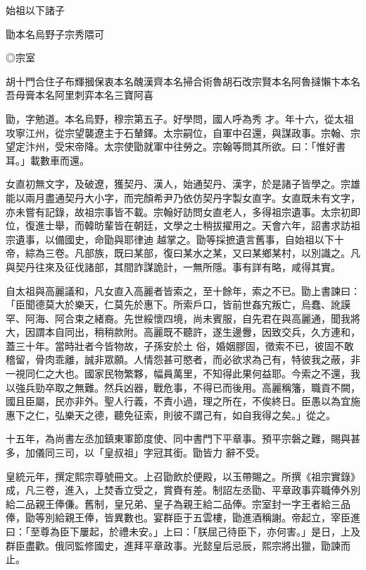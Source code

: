 
\begin{pinyinscope}

 始祖以下諸子



 勖本名烏野子宗秀隈可



 ◎宗室



 胡十門合住子布輝摑保衷本名醜漢齊本名掃合術魯胡石改宗賢本名阿魯撻懶卞本名吾母膏本名阿里刺弈本名三寶阿喜



 勖，字勉道。本名烏野，穆宗第五子。好學問，國人呼為秀
 才。年十六，從太祖攻寧江州，從宗望襲遼主于石輦鐸。太宗嗣位，自軍中召還，與謀政事。宗翰、宗望定汴州，受宋帝降。太宗使勖就軍中往勞之。宗翰等問其所欲。曰：「惟好書耳。」載數車而還。



 女直初無文字，及破遼，獲契丹、漢人，始通契丹、漢字，於是諸子皆學之。宗雄能以兩月盡通契丹大小字，而完顏希尹乃依仿契丹字製女直字。女直既未有文字，亦未嘗有記錄，故祖宗事皆不載。宗翰好訪問女直老人，多得祖宗遺事。太宗初即位，復進士舉，而韓昉輩皆在朝廷，文學之士稍拔擢用之。天會六年，詔書求訪祖宗遺事，以備國史，命勖與耶律迪
 越掌之。勖等採摭遺言舊事，自始祖以下十帝，綜為三卷。凡部族，既曰某部，復曰某水之某，又曰某鄉某村，以別識之。凡與契丹往來及征伐諸部，其間詐謀詭計，一無所隱。事有詳有略，咸得其實。



 自太祖與高麗議和，凡女直入高麗者皆索之，至十餘年，索之不已。勖上書諫曰：「臣聞德莫大於樂天，仁莫先於惠下。所索戶口，皆前世姦宄叛亡，烏蠢、訛謨罕、阿海、阿合束之緒裔。先世綏懷四境，尚未賓服，自先君在與高麗通，聞我將大，因謂本自同出，稍稍款附。高麗既不聽許，遂生邊釁，因致交兵，久方連和，蓋三十年。當時壯者今皆物故，子孫安於土
 俗，婚姻膠固，徵索不已，彼固不敢稽留，骨肉乖離，誠非眾願。人情怨甚可愍者，而必欲求為己有，特彼我之蔽，非一視同仁之大也。國家民物繁夥，幅員萬里，不知得此果何益耶。今索之不還，我以強兵勁卒取之無難。然兵凶器，戰危事，不得已而後用。高麗稱籓，職貢不闕，國且臣屬，民亦非外。聖人行義，不責小過，理之所在，不俟終日。臣愚以為宜施惠下之仁，弘樂天之德，聽免征索，則彼不謂己有，如自我得之矣。」從之。



 十五年，為尚書左丞加鎮東軍節度使、同中書門下平章事。預平宗磐之難，賜與甚多，加儀同三司，以「皇叔祖」字冠其銜。勖皆力
 辭不受。



 皇統元年，撰定熙宗尊號冊文。上召勖飲於便殿，以玉帶賜之。所撰《祖宗實錄》成，凡三卷，進入，上焚香立受之，賞賚有差。制詔左丞勖、平章政事弈職俸外別給二品親王俸傔。舊制，皇兄弟、皇子為親王給二品俸。宗室封一字王者給三品俸，勖等別給親王俸，皆異數也。宴群臣于五雲樓，勖進酒稱謝。帝起立，宰臣進曰：「至尊為臣下屢起，於禮未安。」上曰：「朕屈己待臣下，亦何害。」是日，上及群臣盡歡。俄同監修國史，進拜平章政事。光懿皇后忌辰，熙宗將出獵，勖諫而止。




\end{pinyinscope}
